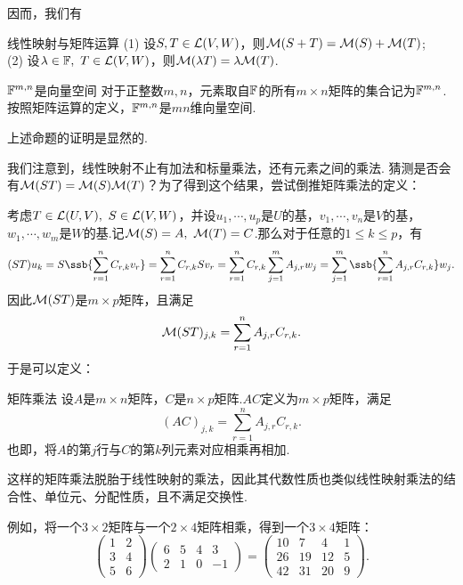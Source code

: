 因而，我们有

\begin{proposition}{线性映射与矩阵运算}\label{pro:xmxkykueyysrjuvf}
	(1) 设$S,T \in \mathcal{L} (V,W)$，则$\mathcal{M} (S+T)=\mathcal{M} (S) + \mathcal{M} (T)$; \\
	(2) 设$\lambda \in \mathbb{F} ,~T \in \mathcal{L} (V,W)$，则$\mathcal{M} (\lambda T) = \lambda \mathcal{M} (T)$. 
\end{proposition}

\begin{proposition}{$\mathbb{F} ^{m,n}$是向量空间}
	对于正整数$m,n$，元素取自$\mathbb{F}$的所有$m \times n$矩阵的集合记为$\mathbb{F} ^{m,n}$.按照矩阵运算的定义，$\mathbb{F} ^{m,n}$是$mn$维向量空间.
\end{proposition}

上述命题的证明是显然的.

我们注意到，线性映射不止有加法和标量乘法，还有元素之间的乘法. 猜测是否会有$\mathcal{M} (ST)= \mathcal{M} (S) \mathcal{M} (T)$？为了得到这个结果，尝试倒推矩阵乘法的定义：

考虑$T \in \mathcal{L} (U,V),~S \in \mathcal{L} (V,W)$，并设$u_1, \cdots ,u_p$是$U$的基，$v_1, \cdots ,v_n$是$V$的基，$w_1, \cdots ,w_m$是$W$的基.记$\mathcal{M} (S)=A,~\mathcal{M} (T)=C$.那么对于任意的$1 \leq k \leq p$，有$$(ST)u_k = S\ssb{\sum_{r=1}^{n} C_{r,k}v_r} = \sum_{r=1}^{n} C_{r,k}Sv_r = \sum_{r=1}^{n} C_{r,k} \sum_{j=1}^{m} A_{j,r}w_j = \sum_{j=1}^{m} \ssb{\sum_{r=1}^{n} A_{j,r} C_{r,k}} w_j.$$
因此$\mathcal{M} (ST)$是$m \times p$矩阵，且满足$$\mathcal{M} (ST)_{j,k} = \sum_{r=1}^{n} A_{j,r} C_{r,k}.$$
于是可以定义：

\begin{definition}{矩阵乘法}
	设$A$是$m \times n$矩阵，$C$是$n \times p$矩阵.$AC$定义为$m \times p$矩阵，满足$$(AC)_{j,k} = \sum_{r=1}^{n} A_{j,r} C_{r,k}.$$
	也即，将$A$的第$j$行与$C$的第$k$列元素对应相乘再相加.
\end{definition}

这样的矩阵乘法脱胎于线性映射的乘法，因此其代数性质也类似线性映射乘法的结合性、单位元、分配性质，且不满足交换性.

例如，将一个$3 \times 2$矩阵与一个$2 \times 4$矩阵相乘，得到一个$3 \times 4$矩阵：$$\begin{pmatrix}
	1 & 2 \\ 3 & 4 \\ 5 & 6
\end{pmatrix} \begin{pmatrix}
	6 & 5 & 4 & 3 \\ 2 & 1 & 0 & -1
\end{pmatrix} = \begin{pmatrix}
	10 & 7 & 4 & 1 \\ 26 & 19 & 12 & 5 \\ 42 & 31 & 20 & 9
\end{pmatrix}.$$

